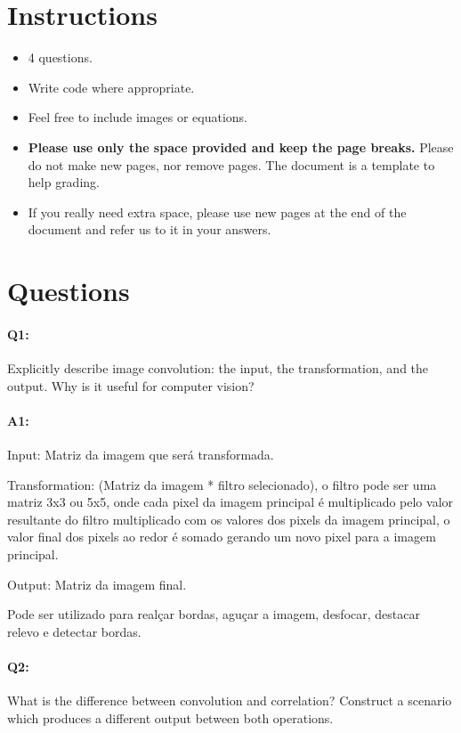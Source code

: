 \section*{Instructions}
\begin{itemize}
  \item 4 questions.
  \item Write code where appropriate.
  \item Feel free to include images or equations.%
  \item \textbf{Please use only the space provided and keep the page breaks.} Please do not make new pages, nor remove pages. The document is a template to help grading.
  \item If you really need extra space, please use new pages at the end of the document and refer us to it in your answers.
\end{itemize}

\section*{Questions}

\paragraph{Q1:} Explicitly describe image convolution: the input, the transformation, and the output. Why is it useful for computer vision?

\paragraph{A1:} Input: Matriz da imagem que será transformada.

Transformation: (Matriz da imagem * filtro selecionado), o filtro pode ser uma matriz 3x3 ou 5x5, onde cada pixel da imagem principal é multiplicado pelo valor resultante do filtro multiplicado com os valores dos pixels da imagem principal, o valor final dos pixels ao redor é somado gerando um novo pixel para a imagem principal.

Output: Matriz da imagem final.

Pode ser utilizado para realçar bordas, aguçar a imagem, desfocar, destacar relevo e detectar bordas.



\pagebreak
\paragraph{Q2:} What is the difference between convolution and correlation? Construct a scenario which produces a different output between both operations.

